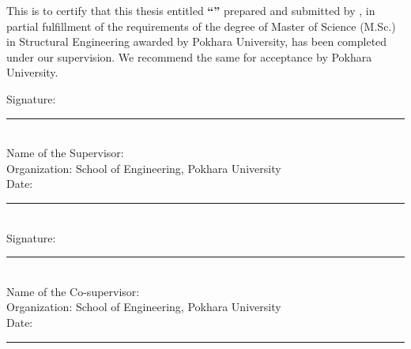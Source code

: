 \justifying
\noindent This is to certify that this thesis entitled \textbf{``\PUThesisTitle''} prepared and submitted by \textbf{\PUStudentName}, in partial fulfillment of the requirements of the degree of Master of Science (M.Sc.) in Structural Engineering awarded by Pokhara University, has been completed under our supervision. We recommend the same for acceptance by Pokhara University.

\vspace{2\baselineskip}
\noindent Signature: \rule{5cm}{0.4pt}\\[0.35\baselineskip]
Name of the Supervisor: \PUSupervisor\\[0.35\baselineskip]
Organization: School of Engineering, Pokhara University\\[0.35\baselineskip]
Date: \rule{4cm}{0.4pt}\\[1.5\baselineskip]
Signature: \rule{5cm}{0.4pt}\\[0.35\baselineskip]
Name of the Co-supervisor: \PUCoSupervisorOne\\[0.35\baselineskip]
Organization: School of Engineering, Pokhara University\\[0.35\baselineskip]
Date: \rule{4cm}{0.4pt}
